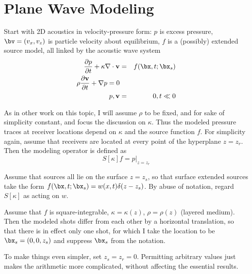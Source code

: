 \section{Plane Wave Modeling}
Start with 2D acoustics in velocity-pressure form: $p$ is excess
pressure, $\bv=(v_x,v_z)$ is particle velocity about equilibrium, $f$
is a (possibly) extended source model, all linked by the acoustic wave system
\begin{eqnarray}
\label{eqn:awe}
\frac{\partial p}{\partial t} + \kappa \nabla \cdot {\bf v} &=&
                                                                f(\bx,t;\bx_s) \nonumber\\
\rho \frac{\partial {\bf v}}{\partial t} + \nabla p = 0 \nonumber\\
p,{\bf v}&=&0, t \ll 0
\end{eqnarray}

As in other work on this topic, I will assume $\rho$ to be fixed, and
for sake of simplicity constant, and focus the discussion on
$\kappa$. Thus the modeled pressure traces at receiver locations
depend on $\kappa$ and the source function $f$. For simplicity again, assume that
receivers are located at every point of the hyperplane $z=z_r$. Then
the modeling operator is defined as
\begin{equation}
\label{eqn:fwd}
S[\kappa]f = p|_{z=z_r}
\end{equation}

Assume that sources all lie on the surface $z=z_s$, so that surface
extended sources take the form $f(\bx,t;\bx_s) =
w(x,t)\delta(z-z_s)$. By abuse of notation, regard $S[\kappa]$ as
acting on $w$.

Assume that $f$ is square-integrable, $\kappa = \kappa(z)$,
$\rho=\rho(z)$ (layered medium). Then the modeled shots differ from
each other by a horizontal translation, so that there is in effect
only one shot, for which I take the location to be
$\bx_s=(0,0,z_s)$ and suppress $\bx_s$ from the notation.

To make things even simpler, set $z_s=z_r=0$. Permitting arbitrary
values just makes the arithmetic more complicated, without affecting
the essential results.

